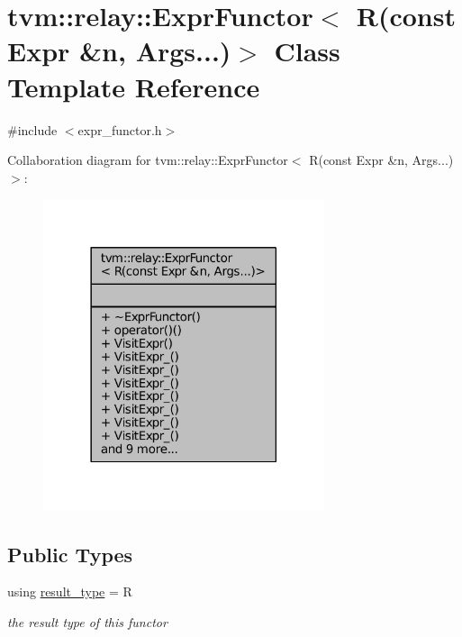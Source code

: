 \hypertarget{classtvm_1_1relay_1_1ExprFunctor_3_01R_07const_01Expr_01_6n_00_01Args_8_8_8_08_4}{}\section{tvm\+:\+:relay\+:\+:Expr\+Functor$<$ R(const Expr \&n, Args...)$>$ Class Template Reference}
\label{classtvm_1_1relay_1_1ExprFunctor_3_01R_07const_01Expr_01_6n_00_01Args_8_8_8_08_4}


{\ttfamily \#include $<$expr\+\_\+functor.\+h$>$}



Collaboration diagram for tvm\+:\+:relay\+:\+:Expr\+Functor$<$ R(const Expr \&n, Args...)$>$\+:
\nopagebreak
\begin{figure}[H]
\begin{center}
\leavevmode
\includegraphics[width=234pt]{classtvm_1_1relay_1_1ExprFunctor_3_01R_07const_01Expr_01_6n_00_01Args_8_8_8_08_4__coll__graph}
\end{center}
\end{figure}
\subsection*{Public Types}
\begin{DoxyCompactItemize}
\item 
using \hyperlink{classtvm_1_1relay_1_1ExprFunctor_3_01R_07const_01Expr_01_6n_00_01Args_8_8_8_08_4_a4558886f7f179396ee11b5fe91927793}{result\+\_\+type} = R
\begin{DoxyCompactList}\small\item\em the result type of this functor \end{DoxyCompactList}\end{DoxyCompactItemize}
